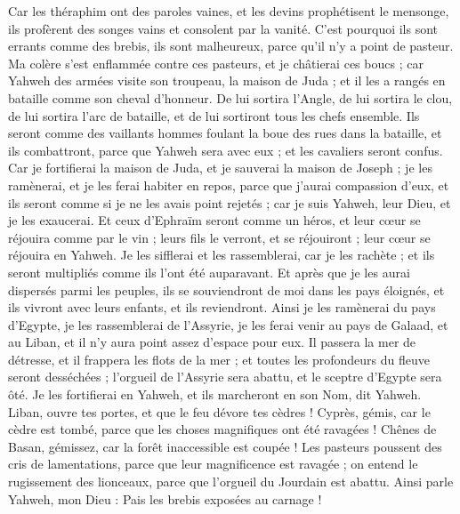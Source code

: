 \begin{multicols}{2}
Car les théraphim ont des paroles vaines, et les devins prophétisent le mensonge, ils profèrent des songes vains et consolent par la vanité. C'est pourquoi ils sont errants comme des brebis, ils sont malheureux, parce qu'il n'y a point de pasteur.
Ma colère s'est enflammée contre ces pasteurs, et je châtierai ces boucs ; car Yahweh des armées visite son troupeau, la maison de Juda ; et il les a rangés en bataille comme son cheval d'honneur.
De lui sortira l’Angle, de lui sortira le clou, de lui sortira l'arc de bataille, et de lui sortiront tous les chefs ensemble.
Ils seront comme des vaillants hommes foulant la boue des rues dans la bataille, et ils combattront, parce que Yahweh sera avec eux ; et les cavaliers seront confus.
Car je fortifierai la maison de Juda, et je sauverai la maison de Joseph ; je les ramènerai, et je les ferai habiter en repos, parce que j'aurai compassion d'eux, et ils seront comme si je ne les avais point rejetés ; car je suis Yahweh, leur Dieu, et je les exaucerai.
Et ceux d'Ephraïm seront comme un héros, et leur cœur se réjouira comme par le vin ; leurs fils le verront, et se réjouiront ; leur cœur se réjouira en Yahweh.
Je les sifflerai et les rassemblerai, car je les rachète ; et ils seront multipliés comme ils l'ont été auparavant.
Et après que je les aurai dispersés parmi les peuples, ils se souviendront de moi dans les pays éloignés, et ils vivront avec leurs enfants, et ils reviendront.
Ainsi je les ramènerai du pays d'Egypte, je les rassemblerai de l'Assyrie, je les ferai venir au pays de Galaad, et au Liban, et il n'y aura point assez d'espace pour eux.
Il passera la mer de détresse, et il frappera les flots de la mer ; et toutes les profondeurs du fleuve seront desséchées ; l'orgueil de l'Assyrie sera abattu, et le sceptre d'Egypte sera ôté.
Je les fortifierai en Yahweh, et ils marcheront en son Nom, dit Yahweh.
\VerseOne{}Liban, ouvre tes portes, et que le feu dévore tes cèdres !
Cyprès, gémis, car le cèdre est tombé, parce que les choses magnifiques ont été ravagées ! Chênes de Basan, gémissez, car la forêt inaccessible est coupée !
Les pasteurs poussent des cris de lamentations, parce que leur magnificence est ravagée ; on entend le rugissement des lionceaux, parce que l'orgueil du Jourdain est abattu.
Ainsi parle Yahweh, mon Dieu : Pais les brebis exposées au carnage !

\end{multicols}
